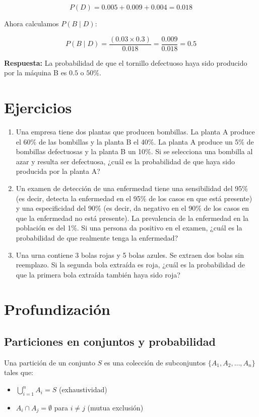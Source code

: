 \documentclass[letterpaper, 12pt]{article}
\begin{document}
	\[
	P(D) = 0.005 + 0.009 + 0.004 = 0.018
	\]
	
	Ahora calculamos \( P(B \mid D) \):
	
	\[
	P(B \mid D) = \frac{(0.03 \times 0.3)}{0.018} = \frac{0.009}{0.018} = 0.5
	\]
	
	\textbf{Respuesta:} La probabilidad de que el tornillo defectuoso haya sido producido por la máquina B es \( 0.5 \) o \( 50\% \).
	
	\section{Ejercicios}
	
	\begin{enumerate}
		\item Una empresa tiene dos plantas que producen bombillas. La planta A produce el 60\% de las bombillas y la planta B el 40\%. La planta A produce un 5\% de bombillas defectuosas y la planta B un 10\%. Si se selecciona una bombilla al azar y resulta ser defectuosa, ¿cuál es la probabilidad de que haya sido producida por la planta A?
		\item Un examen de detección de una enfermedad tiene una sensibilidad del 95\% (es decir, detecta la enfermedad en el 95\% de los casos en que está presente) y una especificidad del 90\% (es decir, da negativo en el 90\% de los casos en que la enfermedad no está presente). La prevalencia de la enfermedad en la población es del 1\%. Si una persona da positivo en el examen, ¿cuál es la probabilidad de que realmente tenga la enfermedad?
		\item Una urna contiene 3 bolas rojas y 5 bolas azules. Se extraen dos bolas sin reemplazo. Si la segunda bola extraída es roja, ¿cuál es la probabilidad de que la primera bola extraída también haya sido roja?
	\end{enumerate}
	
	\section{Profundización}
	
	\subsection{Particiones en conjuntos y probabilidad}
	
	Una partición de un conjunto $S$ es una colección de subconjuntos $\{A_1, A_2, \dots, A_n\}$ tales que:
	\begin{itemize}
		\item $\bigcup_{i=1}^{n} A_i = S$ (exhaustividad)
		\item $A_i \cap A_j = \emptyset$ para $i \neq j$ (mutua exclusión)
	\end{itemize}
	
\end{document}

